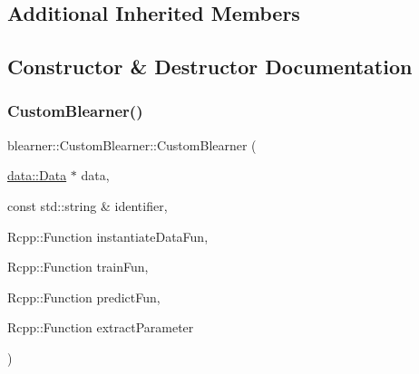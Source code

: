 \subsection*{Additional Inherited Members}


\subsection{Constructor \& Destructor Documentation}
\mbox{\label{classblearner_1_1_custom_blearner_a99b05f69e8d3cacfab556b6a5310f50a}} 
\subsubsection{\texorpdfstring{Custom\+Blearner()}{CustomBlearner()}}
{\footnotesize\ttfamily blearner\+::\+Custom\+Blearner\+::\+Custom\+Blearner (\begin{DoxyParamCaption}\item[{\mbox{\hyperlink{classdata_1_1_data}{data\+::\+Data}} $\ast$}]{data,  }\item[{const std\+::string \&}]{identifier,  }\item[{Rcpp\+::\+Function}]{instantiate\+Data\+Fun,  }\item[{Rcpp\+::\+Function}]{train\+Fun,  }\item[{Rcpp\+::\+Function}]{predict\+Fun,  }\item[{Rcpp\+::\+Function}]{extract\+Parameter }\end{DoxyParamCaption})}

